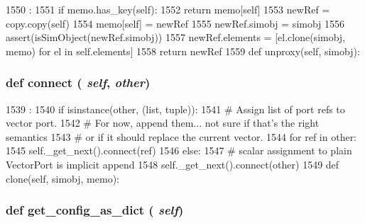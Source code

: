 \begin{DoxyCode}
1550                                  :
1551         if memo.has_key(self):
1552             return memo[self]
1553         newRef = copy.copy(self)
1554         memo[self] = newRef
1555         newRef.simobj = simobj
1556         assert(isSimObject(newRef.simobj))
1557         newRef.elements = [el.clone(simobj, memo) for el in self.elements]
1558         return newRef
1559 
    def unproxy(self, simobj):
\end{DoxyCode}
\hypertarget{classm5_1_1params_1_1VectorPortRef_a0f3e881a92d7a1b4d6d07d9e63180c98}{
\subsubsection[{connect}]{\setlength{\rightskip}{0pt plus 5cm}def connect ( {\em self}, \/   {\em other})}}
\label{classm5_1_1params_1_1VectorPortRef_a0f3e881a92d7a1b4d6d07d9e63180c98}



\begin{DoxyCode}
1539                             :
1540         if isinstance(other, (list, tuple)):
1541             # Assign list of port refs to vector port.
1542             # For now, append them... not sure if that's the right semantics
1543             # or if it should replace the current vector.
1544             for ref in other:
1545                 self._get_next().connect(ref)
1546         else:
1547             # scalar assignment to plain VectorPort is implicit append
1548             self._get_next().connect(other)
1549 
    def clone(self, simobj, memo):
\end{DoxyCode}
\hypertarget{classm5_1_1params_1_1VectorPortRef_ab1772c0da7b9e12819e1c0373513c53c}{
\subsubsection[{get\_\-config\_\-as\_\-dict}]{\setlength{\rightskip}{0pt plus 5cm}def get\_\-config\_\-as\_\-dict ( {\em self})}}
\label{classm5_1_1params_1_1VectorPortRef_ab1772c0da7b9e12819e1c0373513c53c}



